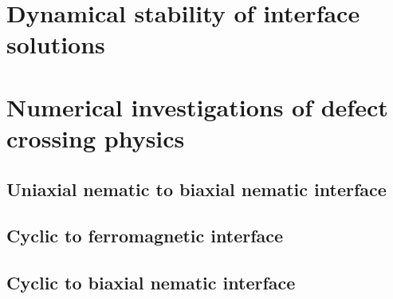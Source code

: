 \section{Dynamical stability of interface solutions}

\section{Numerical investigations of defect crossing physics}
\subsection{Uniaxial nematic to biaxial nematic interface}
\subsection{Cyclic to ferromagnetic interface}
\subsection{Cyclic to biaxial nematic interface}
